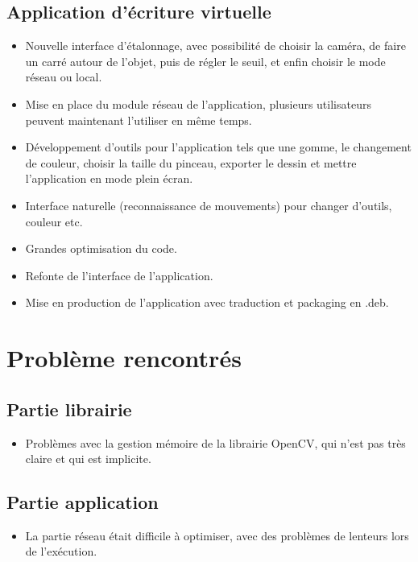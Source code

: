 \documentclass{article}
\begin{document}
		\subsection{Application d'écriture virtuelle}
		\begin{itemize}
		\item Nouvelle interface d'étalonnage, avec possibilité de choisir la caméra, de faire un carré autour de l'objet, 
		puis de régler le seuil, et enfin choisir le mode réseau ou local.
		\item Mise en place du module réseau de l'application, plusieurs utilisateurs peuvent maintenant l'utiliser en même temps.
		\item Développement d'outils pour l'application tels que une gomme, le changement de couleur, choisir la taille
		du pinceau, exporter le dessin et mettre l'application en mode plein écran.
		\item Interface naturelle (reconnaissance de mouvements) pour changer d'outils, couleur etc.
		\item Grandes optimisation du code. 
		\item Refonte de l'interface de l'application.
		\item Mise en production de l'application avec traduction et packaging en .deb.
		\end{itemize}
		
	\section{Problème rencontrés}
		\subsection{Partie librairie}
		\begin{itemize}
		\item Problèmes avec la gestion mémoire de la librairie OpenCV, qui n'est pas très claire et qui est implicite.
		\end{itemize}
		
		\subsection{Partie application}
		\begin{itemize}
		\item La partie réseau était difficile à optimiser, avec des problèmes de lenteurs lors de l'exécution.
		\end{itemize}
	
\end{document}
